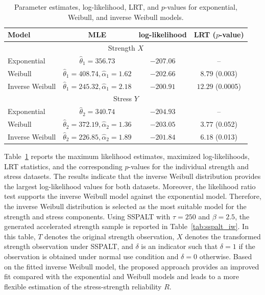 \documentclass[twoside]{article}
\begin{document}
\begin{table}[t]
	\centering
	\caption{Parameter estimates, log-likelihood, LRT, and $p$-values for exponential, Weibull, and inverse Weibull models.}
	\label{tab:model_comparison_iw}
	\scriptsize
	\setlength{\tabcolsep}{4pt}
	\begin{tabular}{lccc}
		\hline
		Model & MLE & log-likelihood & LRT ($p$-value) \\
		\hline
		\multicolumn{4}{c}{Strength $X$} \\
		Exponential & $\hat{\theta}_1=356.73$ & $-207.06$ & -- \\
		Weibull & $\hat{\theta}_1=408.74, \hat{\alpha}_1=1.62$ & $-202.66$ & $8.79$ (0.003) \\
		Inverse Weibull & $\hat{\theta}_1=245.32, \hat{\alpha}_1=2.18$ & $-200.91$ & $12.29$ (0.0005) \\
		\hline
		\multicolumn{4}{c}{Stress $Y$} \\
		Exponential & $\hat{\theta}_2=340.74$ & $-204.93$ & -- \\
		Weibull & $\hat{\theta}_2=372.19, \hat{\alpha}_2=1.36$ & $-203.05$ & $3.77$ (0.052) \\
		Inverse Weibull & $\hat{\theta}_2=226.85, \hat{\alpha}_2=1.89$ & $-201.84$ & $6.18$ (0.013) \\
		\hline
	\end{tabular}
\end{table}
Table~\ref{tab:model_comparison_iw} reports the maximum likelihood estimates, maximized log-likelihoods, LRT statistics, and the corresponding $p$-values for the individual strength and stress datasets. The results indicate that the inverse Weibull distribution provides the largest log-likelihood values for both datasets. Moreover, the likelihood ratio test supports the inverse Weibull model against the exponential model. Therefore, the inverse Weibull distribution is selected as the most suitable model for the strength and stress components. Using SSPALT with $\tau=250$ and $\beta=2.5$, the generated accelerated strength sample is reported in Table~\ref{tab:sspalt_iw}. In this table, $T$ denotes the original strength observation, $X$ denotes the transformed strength observation under SSPALT, and $\delta$ is an indicator such that $\delta=1$ if the observation is obtained under normal use condition and $\delta=0$ otherwise. Based on the fitted inverse Weibull model, the proposed approach provides an improved fit compared with the exponential and Weibull models and leads to a more flexible estimation of the stress-strength reliability $R$.
\end{document}
